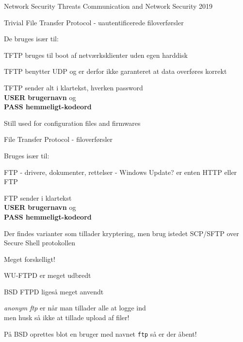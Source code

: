 \documentclass[Screen16to9,17pt]{foils}
\begin{document}
\mytitlepage
{Network Security Threats}
{Communication and Network Security 2019}




\begin{list1}
\item Trivial File Transfer Protocol - uautentificerede filoverførsler
\item De bruges især til:
  \begin{list2}
\item TFTP bruges til boot af netværksklienter uden egen harddisk
\item TFTP benytter UDP og er derfor ikke garanteret at data overføres korrekt
  \end{list2}
\item TFTP sender alt i klartekst, hverken password \\
{\bfseries USER brugernavn} og \\
{\bfseries PASS hemmeligt-kodeord}
\end{list1}
Still used for configuration files and firmwares


\begin{list1}
\item File Transfer Protocol - filoverførsler
\item Bruges især til:
  \begin{list2}
    \item FTP - drivere, dokumenter, rettelser - Windows Update? er
    enten HTTP eller FTP
  \end{list2}
\item FTP sender i klartekst\\
{\bfseries USER brugernavn} og \\
{\bfseries PASS hemmeligt-kodeord}
\item Der findes varianter som tillader kryptering, men brug istedet SCP/SFTP over Secure Shell protokollen
\end{list1}



\begin{list1}
\item Meget forskelligt!
\item WU-FTPD er meget udbredt
\item BSD FTPD ligeså meget anvendt
\item \emph{anonym ftp} er når man tillader alle at logge ind\\
men husk så ikke at tillade upload af filer!
\item På BSD oprettes blot en bruger med navnet \verb+ftp+ så er der åbent!
\end{list1}
\end{document}
